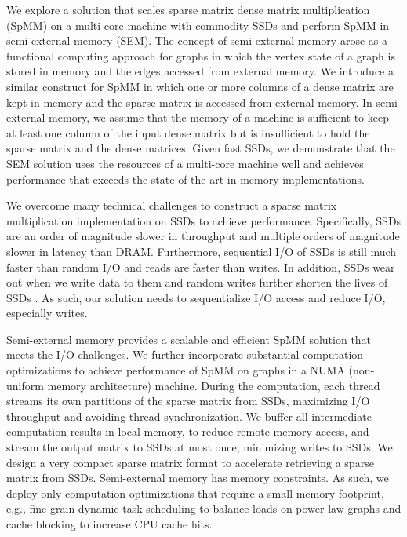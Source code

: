 We explore a solution that scales sparse matrix dense matrix multiplication
(SpMM) on a multi-core machine with commodity SSDs and
perform SpMM in semi-external memory (SEM). The concept of semi-external memory
arose as a functional computing approach for graphs \cite{Abello98} in which
the vertex state of a graph is stored in memory and the edges accessed from
external memory. We introduce a similar construct for SpMM in which one or more
columns of a dense matrix are kept in memory and the sparse matrix is accessed
from external memory. In semi-external memory, we assume
that the memory of a machine is sufficient to keep at least one column
of the input dense matrix but is insufficient to hold the sparse matrix
and the dense matrices. Given fast SSDs, we demonstrate that the SEM
solution uses the resources of a multi-core machine well and
achieves performance that exceeds the state-of-the-art in-memory implementations.


We overcome many technical challenges to construct a sparse matrix
multiplication implementation on SSDs to achieve performance. Specifically,
SSDs are an order of magnitude slower in throughput and multiple orders of
magnitude slower in latency than DRAM. Furthermore, sequential I/O of SSDs
is still much faster
than random I/O \cite{safs} and reads are faster than writes. In addition,
SSDs wear out when we write data to them and random writes further shorten
the lives of SSDs \cite{sfs}. As such, our solution needs to sequentialize
I/O access and reduce I/O, especially writes.

Semi-external memory provides a scalable and efficient SpMM solution that
meets the I/O challenges.  We further incorporate substantial computation optimizations
to achieve performance of SpMM on graphs in a NUMA (non-uniform memory
architecture) machine. During the computation, each
thread streams its own partitions of the sparse matrix from SSDs, maximizing
I/O throughput and avoiding thread synchronization. We buffer all
intermediate computation results in local memory, to reduce remote memory
access, and stream the output matrix to SSDs at most once, minimizing writes
to SSDs. We design a very compact sparse matrix format to accelerate retrieving
a sparse matrix from SSDs. Semi-external memory has memory constraints.
As such, we deploy only computation optimizations that require a small memory
footprint, e.g., fine-grain dynamic task scheduling to balance loads on
power-law graphs and cache blocking to increase CPU cache hits.

